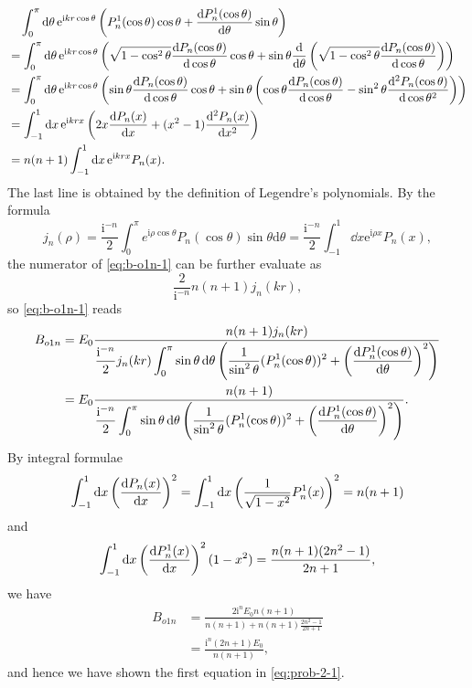\documentclass[hyperref, a4paper]{article}
\newcommand*{\ii}{\mathrm{i}}
\newcommand*{\ee}{\mathrm{e}}
\begin{document}
\[
    \begin{aligned}
        &\quad \int_0^\pi \dd{\theta} \ee^{\ii k r \cos \theta} \left( P^1_n(\cos\theta) \cos\theta + \dv{P^1_n(\cos\theta)}{\theta} \sin \theta \right) \\
        &= \int_0^\pi \dd{\theta} \ee^{\ii k r \cos \theta} \left( \sqrt{1 - \cos^2\theta} \dv{P_n(\cos\theta)}{\cos \theta } \cos\theta + \sin \theta \dv{\theta} \left( \sqrt{1 - \cos^2\theta} \dv{P_n(\cos\theta)}{\cos \theta }  \right) \right) \\
        &= \int_0^\pi \dd{\theta} \ee^{\ii k r \cos \theta} \left( \sin\theta \dv{P_n(\cos\theta)}{\cos \theta } \cos\theta + \sin \theta \left( \cos\theta \dv{P_n(\cos\theta)}{\cos\theta} - \sin^2\theta \dv[2]{P_n(\cos\theta)}{\cos\theta} \right) \right) \\
        &= \int_{-1}^1 \dd{x} \ee^{\ii k r x} \left( 2 x \dv{P_n(x)}{x} + (x^2 - 1) \dv[2]{P_n(x)}{x} \right) \\
        &= n(n+1) \int_{-1}^1 \dd{x} \ee^{\ii k r x} P_n(x).
    \end{aligned}
\] 
The last line is obtained by the definition of Legendre's polynomials.
By the formula 
\begin{equation}
    j_{n}(\rho)=\frac{\mathrm{i}^{-n}}{2} \int_{0}^{\pi} e^{\mathrm{i} \rho \cos \theta} P_{n}(\cos \theta) \sin \theta \mathrm{d} \theta = \frac{\ii^{-n}}{2} \int_{-1}^1 \dd{x} \ee^{\ii \rho x} P_n(x) ,
    \label{eq:integral-formula-1}
\end{equation}
the numerator of \eqref{eq:b-o1n-1} can be further evaluate as 
\[
    \frac{2}{\ii^{-n}} n(n+1) j_n(kr),
\]
so \eqref{eq:b-o1n-1} reads
\begin{equation}
    \begin{aligned}
        B_{o1n} &= E_0 \frac{n(n+1) j_n(kr)}{\displaystyle \frac{\ii^{-n}}{2} j_n(kr) \int_0^\pi \sin \theta \dd{\theta} \left( \frac{1}{\sin^2 \theta} (P^1_n(\cos \theta))^2 + \left( \dv{P_n^1(\cos\theta)}{\theta} \right)^2 \right) } \\
        &= E_0 \frac{n(n+1)}{\displaystyle \frac{\ii^{-n}}{2}  \int_0^\pi \sin \theta \dd{\theta} \left( \frac{1}{\sin^2 \theta} (P^1_n(\cos \theta))^2 + \left( \dv{P_n^1(\cos\theta)}{\theta} \right)^2 \right) }.
    \end{aligned}
\end{equation}
By integral formulae 
\[
    \int_{-1}^1 \dd{x} \left( \dv{P_n(x)}{x} \right)^2 = \int_{-1}^1 \dd{x} \left( \frac{1}{\sqrt{1 - x^2}} P_n^1(x) \right)^2 = n(n+1)
\]
and 
\[
    \int_{-1}^1 \dd{x} \left( \dv{P^1_n(x)}{x} \right)^2 (1 - x^2) = \frac{n(n+1)(2n^2-1)}{2n+1},
\]
we have 
\[
    \begin{aligned}
        B_{o1n} &= \frac{2 \ii^n E_0 n(n+1)}{n(n+1) + n(n+1) \frac{2n^2 - 1}{2n+1}} \\
        &= \frac{\ii^n (2n+1) E_0 }{n(n+1)},
    \end{aligned}
\]
and hence we have shown the first equation in \eqref{eq:prob-2-1}.
\end{document}

